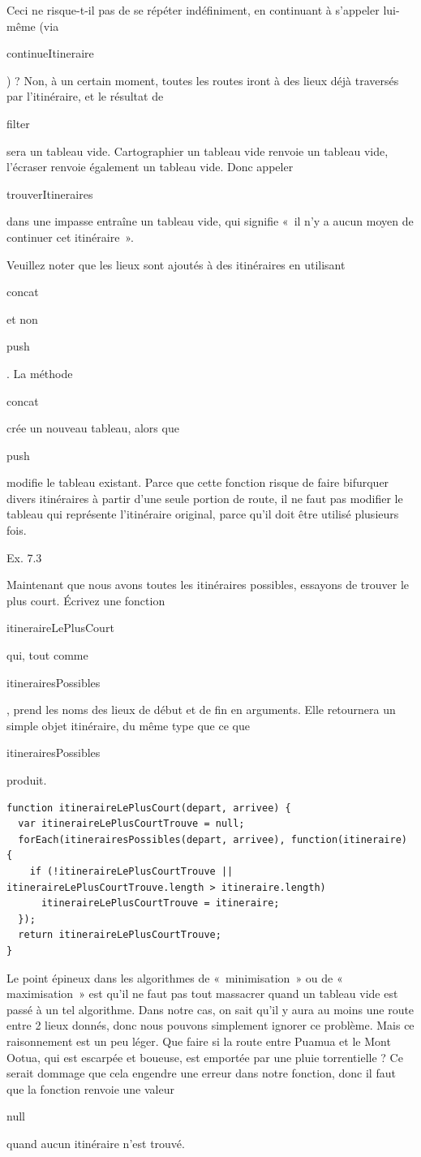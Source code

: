 \documentclass{FramateX}
\renewcommand{\texttt}[1]{\begin{sffamily}{#1}\end{sffamily}}
\begin{document}
Ceci ne risque-t-il pas de se répéter indéfiniment, en continuant à
s'appeler lui-même (via \texttt{continueItineraire}) ? Non, à un certain
moment, toutes les routes iront à des lieux déjà traversés par
l'itinéraire, et le résultat de \texttt{filter} sera un tableau vide.
Cartographier un tableau vide renvoie un tableau vide, l'écraser renvoie
également un tableau vide. Donc appeler \texttt{trouverItineraires} dans
une impasse entraîne un tableau vide, qui signifie «~il n'y a aucun
moyen de continuer cet itinéraire~».

Veuillez noter que les lieux sont ajoutés à des itinéraires en utilisant
\texttt{concat} et non \texttt{push}. La méthode \texttt{concat} crée un
nouveau tableau, alors que \texttt{push} modifie le tableau existant.
Parce que cette fonction risque de faire bifurquer divers itinéraires à
partir d'une seule portion de route, il ne faut pas modifier le tableau
qui représente l'itinéraire original, parce qu'il doit être utilisé
plusieurs fois.

\begin{center}\end{center}

Ex. 7.3

Maintenant que nous avons toutes les itinéraires possibles, essayons de
trouver le plus court. Écrivez une fonction
\texttt{itineraireLePlusCourt} qui, tout comme
\texttt{itinerairesPossibles}, prend les noms des lieux de début et de
fin en arguments. Elle retournera un simple objet itinéraire, du même
type que ce que \texttt{itinerairesPossibles} produit.

\begin{lstlisting}
function itineraireLePlusCourt(depart, arrivee) {
  var itineraireLePlusCourtTrouve = null;
  forEach(itinerairesPossibles(depart, arrivee), function(itineraire) {
    if (!itineraireLePlusCourtTrouve || itineraireLePlusCourtTrouve.length > itineraire.length)
      itineraireLePlusCourtTrouve = itineraire;
  });
  return itineraireLePlusCourtTrouve;
}
\end{lstlisting}
Le point épineux dans les algorithmes de «~minimisation~» ou de «
maximisation~» est qu'il ne faut pas tout massacrer quand un tableau
vide est passé à un tel algorithme. Dans notre cas, on sait qu'il y aura
au moins une route entre 2 lieux donnés, donc nous pouvons simplement
ignorer ce problème. Mais ce raisonnement est un peu léger. Que faire si
la route entre Puamua et le Mont Ootua, qui est escarpée et boueuse, est
emportée par une pluie torrentielle ? Ce serait dommage que cela
engendre une erreur dans notre fonction, donc il faut que la fonction
renvoie une valeur \texttt{null} quand aucun itinéraire n'est trouvé.
\end{document}
